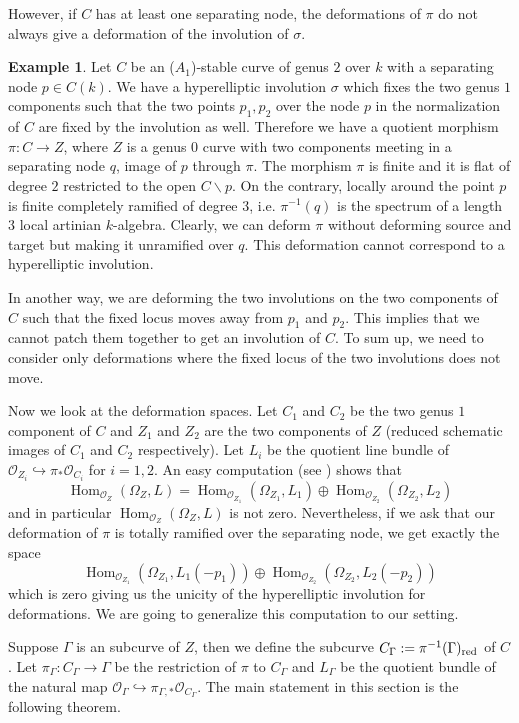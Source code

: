 \documentclass{alggeom}
\numberwithin{equation}{section}
\numberwithin{subsection}{section}
\theoremstyle{definition}
\newtheorem{example}[theorem]{Example}
\theoremstyle{remark}
\newcommand\cO{\mathcal{O}} \newcommand\cP{\mathcal{P}}
\renewcommand\hom{\operatorname{Hom}}
\renewcommand{\setminus}{\smallsetminus}
\begin{document}
However, if $C$ has at least one separating node, the deformations of $\pi$ do not always give a deformation of the involution of $\sigma$. 

\begin{example}\label{ex:not-involution}
	Let $C$ be an ($A_1$)-stable curve of genus $2$ over $k$ with a separating node $p \in C(k)$. We have a hyperelliptic involution $\sigma$ which fixes the two genus $1$ components such that the two points $p_1,p_2$ over the node $p$ in the normalization of $C$ are fixed by the involution as well. Therefore we have a quotient morphism $\pi:C \rightarrow Z$, where $Z$ is a genus $0$ curve with two components meeting in a separating node $q$, image of $p$ through $\pi$. The morphism $\pi$ is finite and it is flat of degree $2$ restricted to the open $C \setminus p$. On the contrary, locally around the point $p$ is finite completely ramified of degree $3$, i.e. $\pi^{-1}(q)$ is the spectrum of a length $3$ local artinian $k$-algebra. Clearly, we can deform $\pi$ without deforming source and target but making it unramified over $q$. This deformation cannot correspond to a hyperelliptic involution. 
	
	In another way, we are deforming the two involutions on the two components of $C$ such that the fixed locus moves away from $p_1$ and $p_2$. This implies that we cannot patch them together to get an involution of $C$. To sum up, we need to consider only deformations where the fixed locus of the two involutions does not move. 
	
	Now we look at the deformation spaces. Let $C_1$ and $C_2$ be the two genus $1$ component of $C$ and $Z_1$ and $Z_2$ are the two components of $Z$ (reduced schematic images of $C_1$ and $C_2$ respectively). Let $L_i$ be the quotient line bundle of $\cO_{Z_i} \hookrightarrow \pi_*\cO_{C_i}$ for $i=1,2$. An easy computation (see ) shows that $$\hom_{\cO_Z}(\Omega_Z,L)=\hom_{\cO_{Z_1}}(\Omega_{Z_1},L_1)\oplus \hom_{\cO_{Z_2}}(\Omega_{Z_2},L_2)$$
	and in particular $\hom_{\cO_Z}(\Omega_Z,L)$ is not zero. Nevertheless, if we ask that our deformation of $\pi$ is totally ramified over the separating node, we get exactly the space $$\hom_{\cO_{Z_1}}(\Omega_{Z_1},L_1(-p_1))\oplus \hom_{\cO_{Z_2}}(\Omega_{Z_2},L_2(-p_2))$$ which is zero giving us the unicity of the hyperelliptic involution for deformations. We are going to generalize this computation to our setting.
\end{example}

Suppose $\Gamma$ is an  subcurve of $Z$, then we define the subcurve $C_{\Gamma}:=\pi^{-1}(\Gamma)_{\rm red}$ of $C$. Let $\pi_{\Gamma}:C_{\Gamma}\rightarrow \Gamma$ be the restriction of $\pi$ to $C_{\Gamma}$ and $L_{\Gamma}$ be the quotient bundle of the natural map $\cO_{\Gamma}\hookrightarrow \pi_{\Gamma,*}\cO_{C_{\Gamma}}$.
The main statement in this section is the following theorem.
\end{document}
